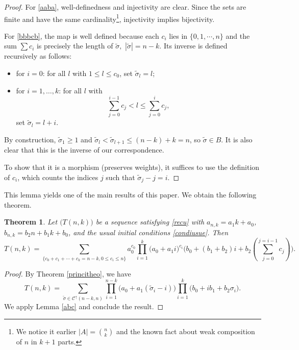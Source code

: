 \documentclass[12pt,a4paper]{article}
\newtheorem{theorem}{Theorem}[section]
\theoremstyle{definition} %
\theoremstyle{remark}
\theoremstyle{examples}
\newcommand{\suit}[1]{{#1}(n,k)}
\newcommand{\coul}[1]{#1_{n,k}}
\newcommand{\coss}{\cdots}
\begin{document}
\begin{proof}
	For \ref{aaba}, well-definedness and injectivity are clear. Since the sets are finite and have the same cardinality\footnote{We notice it earlier $|A|=\binom{n}{k}$  and the known fact about weak composition of $n$ in $k+1$ parts.}, injectivity implies bijectivity.
	
	For \ref{bbbcb}, the map is well defined because each $c_i$ lies in $\{0,1,\coss,n\}$ and the sum $\sum c_i$ is precisely the length of $\tilde{\sigma},$ $|\tilde{\sigma}|=n-k$. Its inverse is defined recursively as follows:
	\begin{itemize}
		\item for $i=0$: for all $l$ with $1\leq l\leq c_0$, set $\tilde{\sigma}_l=l$;
		\item for $i=1,\dots,k$: for all $l$ with
		\[
		\sum_{j=0}^{i-1}c_j< l\leq \sum_{j=0}^{i} c_j,
		\]
		set $\tilde{\sigma}_l=l+i$.
	\end{itemize}
	By construction, $\tilde{\sigma}_1\geq 1$ and $\tilde{\sigma}_l<\tilde{\sigma}_{l+1}\leq (n-k)+k=n$, so $\tilde{\sigma}\in B$. It is also clear that this is the inverse of our correspondence.
	
	To show that it is a morphism (preserves weights), it suffices to use the definition of $c_i$, which counts the indices $j$ such that $\tilde{\sigma}_j-j=i$. %
\end{proof}
\noindent This lemma yields one of the main results of this paper. We obtain the following theorem.
\begin{theorem}\label{theocontr}
	Let $\big(\suit{T}\big)$ be a sequence satisfying \eqref{recu} with $\coul{a} = a_1 k + a_0$, $\coul{b} = b_2n+b_1k+b_0$, and the usual initial conditions \eqref{condiusue}. 
	Then
	\begin{equation}
	\suit{T} = \sum_{\{c_0+c_1+\coss+c_{k}=n-k, 0\leq c_i\leq n\}}  a_0^{c_0}\prod_{i=1}^{k} \big(a_0+a_1i\big)^{c_{i}} \Big(b_0+ (b_1+b_2)i+b_2 (\sum_{j=0}^{j=i-1}c_j) \Big).
	\end{equation}
\end{theorem}
\begin{proof}
	By Theorem \ref{princitheo}, we have 
	\[  \suit{T}
	=\sum_{\tilde{\sigma} \in \mathcal{C}^\uparrow(n-k,n)}
	\prod_{i=1}^{n-k} \big( a_0+ a_1( \tilde{\sigma}_i-i) \big)
	\prod_{i=1}^{k} \big( b_0+ib_1+b_2 \sigma_i \big). \] We apply Lemma \ref{abc} and conclude the result.
\end{proof}
\end{document}
